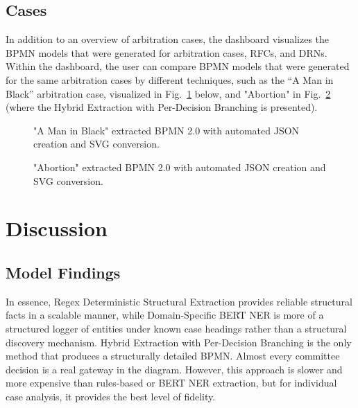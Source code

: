 \documentclass[conference]{IEEEtran}
\begin{document}
\subsection{Cases}
In addition to an overview of arbitration cases, the dashboard visualizes the BPMN models that were generated for arbitration cases, RFCs, and DRNs. Within the dashboard, the user can compare BPMN models that were generated for the same arbitration cases by different techniques, such as the “A Man in Black” arbitration case, visualized in Fig.~\ref{fig:bpmn-A Man in Black-svg} below, and "Abortion" in Fig.~\ref{fig:bpmn-Abortion-svg} (where the Hybrid Extraction with Per-Decision Branching is presented).

\begin{figure}[t!]
\centerline{}
\caption{"A Man in Black" extracted BPMN 2.0 with automated JSON creation and SVG conversion.}
\label{fig:bpmn-A Man in Black-svg}
\end{figure}

\begin{figure}[t!]
\centerline{}
\caption{"Abortion" extracted BPMN 2.0 with automated JSON creation and SVG conversion.}
\label{fig:bpmn-Abortion-svg}
\end{figure}

\section{Discussion}

\subsection{Model Findings}
In essence, Regex Deterministic Structural Extraction provides reliable structural facts in a scalable manner, while Domain-Specific BERT NER is more of a structured logger of entities under known case headings rather than a structural discovery mechanism. Hybrid Extraction with Per-Decision Branching is the only method that produces a structurally detailed BPMN. Almost every committee decision is a real gateway in the diagram. However, this approach is slower and more expensive than rules-based or BERT NER extraction, but for individual case analysis, it provides the best level of fidelity.
\end{document}

